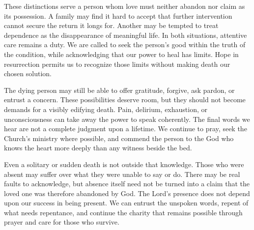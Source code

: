These distinctions serve a person whom love must neither abandon nor claim as its possession. A family may find it hard to accept that further intervention cannot secure the return it longs for. Another may be tempted to treat dependence as the disappearance of meaningful life. In both situations, attentive care remains a duty. We are called to seek the person's good within the truth of the condition, while acknowledging that our power to heal has limits. Hope in resurrection permits us to recognize those limits without making death our chosen solution.

The dying person may still be able to offer gratitude, forgive, ask pardon, or entrust a concern. These possibilities deserve room, but they should not become demands for a visibly edifying death. Pain, delirium, exhaustion, or unconsciousness can take away the power to speak coherently. The final words we hear are not a complete judgment upon a lifetime. We continue to pray, seek the Church's ministry where possible, and commend the person to the God who knows the heart more deeply than any witness beside the bed.

Even a solitary or sudden death is not outside that knowledge. Those who were absent may suffer over what they were unable to say or do. There may be real faults to acknowledge, but absence itself need not be turned into a claim that the loved one was therefore abandoned by God. The Lord's presence does not depend upon our success in being present. We can entrust the unspoken words, repent of what needs repentance, and continue the charity that remains possible through prayer and care for those who survive.


